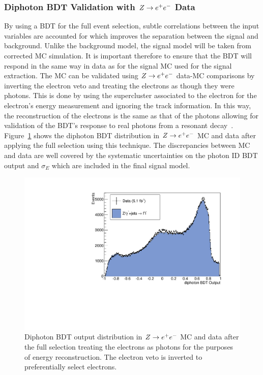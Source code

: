 \subsubsection{Diphoton BDT Validation with $Z\rightarrow e^{+}e^{-}$ Data}
By using a BDT for the full event selection, subtle correlations between the input variables are accounted for
which improves the separation between the signal and background. 
Unlike the background model, the signal model will be taken from corrected MC simulation. 
It is important therefore to ensure that the BDT will respond in the same way in data as for the signal MC
used for the signal extraction. The MC can be validated using $Z\rightarrow e^{+}e^{-}$ data-MC
comparisons by inverting the electron veto and treating the electrons as though they were photons.
This is done by using the supercluster associated to the electron for the electron's energy measurement 
and ignoring the track information. In this way, the reconstruction of the electrons is the same as that
of the photons allowing for validation of the BDT's response to real photons from a resonant decay~\citep{null}. 
Figure~\ref{fig:zeevaliddiphomva} shows the diphoton BDT distribution in $Z\rightarrow e^{+}e^{-}$ MC and data after applying
the full selection using this technique. The discrepancies between MC and data are well covered by the 
systematic uncertainties on the photon ID BDT output and $\sigma_{E}$ which are included in the final signal model. 

\begin{figure}
  \includegraphics[width=.6\textwidth]{hgg7TeV/zeeValidation/zeevalidationdipho.pdf}
\caption{Diphoton BDT output distribution in $Z\rightarrow e^{+}e^{-}$ MC and data after the full selection 
treating the electrons as photons for the purposes of energy reconstruction. The electron 
veto is inverted to preferentially select electrons.}
\label{fig:zeevaliddiphomva}
\end{figure}


